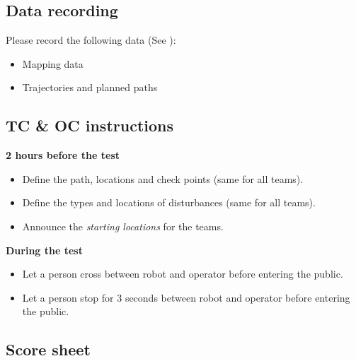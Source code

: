 \subsection{Data recording}
Please record the following data (See ):
\begin{itemize}
\item Mapping data
\item Trajectories and planned paths
\end{itemize}


\subsection{TC \& OC instructions}

\textbf{2 hours before the test}
\begin{itemize}
\item Define the path, locations and check points (same for all teams).
\item Define the types and locations of disturbances (same for all teams).
\item Announce the \emph{starting locations} for the teams.
\end{itemize}

\textbf{During the test}
\begin{itemize}
\item Let a person cross between robot and operator before entering the public.
\item Let a person stop for 3 seconds between robot and operator before entering the public.
\end{itemize}

\newpage

\subsection{Score sheet}


